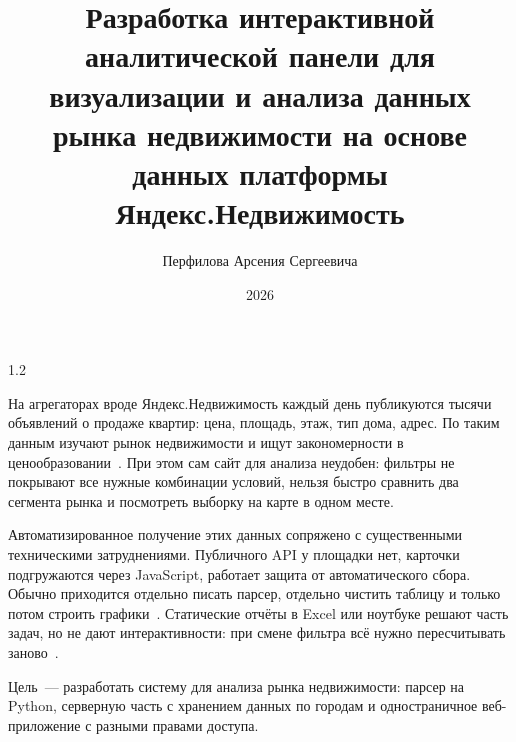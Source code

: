 \documentclass[coursework]{SCWorks}
\begin{document}

\title{Разработка интерактивной аналитической панели для визуализации и анализа данных рынка недвижимости на основе данных платформы Яндекс.Недвижимость}



\author{Перфилова Арсения Сергеевича}



\date{2026}

\begin{spacing}{1.2}
    \maketitle
\end{spacing}

\secNumbering

\tableofcontents

\intro

На агрегаторах вроде Яндекс.Недвижимость каждый день публикуются тысячи объявлений о продаже квартир: цена, площадь, этаж, тип дома, адрес. По таким данным изучают рынок недвижимости и ищут закономерности в ценообразовании~\cite{soboleva2023,belyaev2015}. При этом сам сайт для анализа неудобен: фильтры не покрывают все нужные комбинации условий, нельзя быстро сравнить два сегмента рынка и посмотреть выборку на карте в одном месте.

Автоматизированное получение этих данных сопряжено с существенными техническими затруднениями. Публичного API у площадки нет, карточки подгружаются через JavaScript, работает защита от автоматического сбора. Обычно приходится отдельно писать парсер, отдельно чистить таблицу и только потом строить графики~\cite{nesterov2024,selenium}. Статические отчёты в Excel или ноутбуке решают часть задач, но не дают интерактивности: при смене фильтра всё нужно пересчитывать заново~\cite{filatov2013,ahtimirov2024}.

Цель~--- разработать систему для анализа рынка недвижимости: парсер на Python, серверную часть с хранением данных по городам и одностраничное веб-приложение с разными правами доступа.
\end{document}
